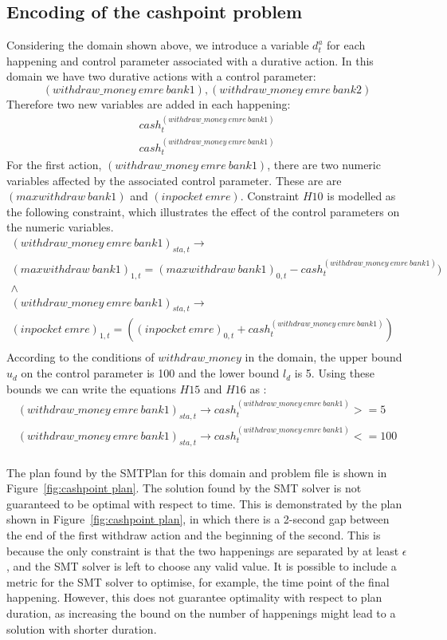 \subsection{Encoding of the cashpoint problem}

Considering the domain shown above, we introduce a variable $d^a_t$ for each happening and control parameter associated with a durative action. In this domain we have two durative actions with a control parameter:
$$
(withdraw\_money\ emre\ bank1), (withdraw\_money\ emre\ bank2)
$$
Therefore two new variables are added in each happening:
$$
\begin{array}{l}
cash^{(withdraw\_money\ emre\ bank1)}_t\\
cash^{(withdraw\_money\ emre\ bank1)}_t
\end{array}
$$
For the first action, $(withdraw\_money\ emre\ bank1)$, there are two numeric variables affected by the associated control parameter. These are are $(maxwithdraw \ bank1)$ and  $(inpocket \ emre)$. Constraint $H10$ is modelled as the following constraint, which illustrates the effect of the control parameters on the numeric variables.
$$
\begin{array}{c}
(withdraw\_money\ emre\ bank1)_{sta,t}  \rightarrow \\
(maxwithdraw\ bank1)_{1,t} = (maxwithdraw\ bank1)_{0,t} - cash^{(withdraw\_money\ emre\ bank1)}_t) \\
\wedge \\
(withdraw\_money\ emre\ bank1)_{sta,t}  \rightarrow \\
(inpocket\ emre)_{1,t} = ((inpocket\ emre)_{0,t} + cash^{(withdraw\_money\ emre\ bank1)}_t) \\
\end{array}
$$
According to the conditions of $withdraw\_money$ in the domain, the upper bound $u_d$ on the control parameter is 100 and the lower bound $l_d$ is 5. Using these bounds we can write the equations $H15$ and $H16$ as :
$$
\begin{array}{l}
(withdraw\_money\ emre\ bank1)_{sta,t}  \rightarrow cash^{(withdraw\_money\ emre\ bank1)}_t >=  5 \\
(withdraw\_money\ emre\ bank1)_{sta,t}  \rightarrow cash^{(withdraw\_money\ emre\ bank1)}_t <=  100  \\
\end{array}
$$

The plan found by the SMTPlan for this domain and problem file is shown in Figure~\ref{fig:cashpoint plan}. The solution found by the SMT solver is not guaranteed to be optimal with respect to time. This is demonstrated by the plan shown in Figure~\ref{fig:cashpoint plan}, in which there is a 2-second gap between the end of the first withdraw action and the beginning of the second. This is because the only constraint is that the two happenings are separated by at least $\epsilon$, and the SMT solver is left to choose any valid value. It is possible to include a metric for the SMT solver to optimise, for example, the time point of the final happening. However, this does not guarantee optimality with respect to plan duration, as increasing the bound on the number of happenings might lead to a solution with shorter duration.

